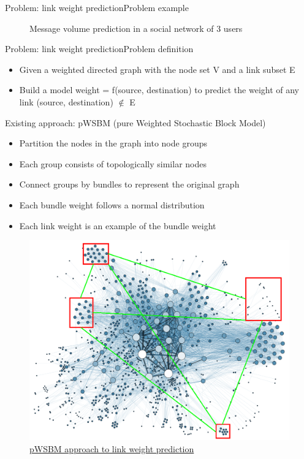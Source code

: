 \documentclass{beamer}
\begin{document}
\begin{frame}{Problem: link weight prediction}{Problem example}
	\begin{figure}[H]\centering
		\caption{Message volume prediction in a social network of 3 users}
		\label{fig:example}
	\end{figure}
\end{frame}

\begin{frame}{Problem: link weight prediction}{Problem definition}
	\begin{itemize}
		\item Given a weighted directed graph with the node set V and a link subset E
		\item Build a model weight = f(source, destination) to predict the weight of any link (source, destination) $ \notin $ E
	\end{itemize}
\end{frame}

\begin{frame}{Existing approach: pWSBM (pure Weighted Stochastic Block Model)}
	\begin{itemize}
		\item Partition the nodes in the graph into node groups
		\item Each group consists of topologically similar nodes
		\item Connect groups by bundles to represent the original graph
		\item Each bundle weight follows a normal distribution
		\item Each link weight is an example of the bundle weight
	\end{itemize}
	\begin{figure}[H]
		\centering
		\includegraphics[width=0.4\linewidth]{SBM}
		\caption{ \href{https://commons.wikimedia.org/wiki/File:Social_Network_Analysis_Visualization.png}{pWSBM approach to link weight prediction}}
		\label{fig:SBM}
	\end{figure}
\end{frame}
\end{document}
